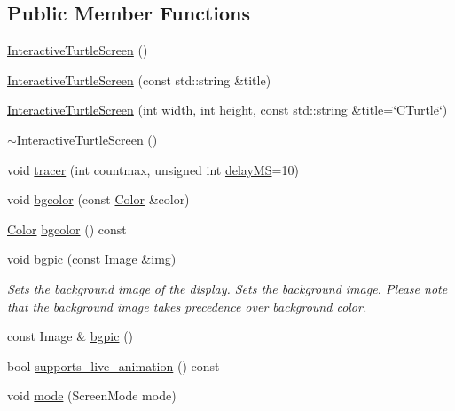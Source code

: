 \subsection*{Public Member Functions}
\begin{DoxyCompactItemize}
\item 
\hyperlink{classcturtle_1_1InteractiveTurtleScreen_a3a2fc53b07958002992b8189a5af62f6}{Interactive\+Turtle\+Screen} ()
\item 
\hyperlink{classcturtle_1_1InteractiveTurtleScreen_ad65865be39cbe33c8614bb14f918058f}{Interactive\+Turtle\+Screen} (const std\+::string \&title)
\item 
\hyperlink{classcturtle_1_1InteractiveTurtleScreen_af9fb0672e3b17b2c07497de0b9ef99ee}{Interactive\+Turtle\+Screen} (int width, int height, const std\+::string \&title=\char`\"{}C\+Turtle\char`\"{})
\item 
\hyperlink{classcturtle_1_1InteractiveTurtleScreen_a74aecb49c64fd0035750c521d6029ccf}{$\sim$\+Interactive\+Turtle\+Screen} ()
\item 
void \hyperlink{classcturtle_1_1InteractiveTurtleScreen_ac6cbbcf714c490abb300cd6a931950f3}{tracer} (int countmax, unsigned int \hyperlink{classcturtle_1_1InteractiveTurtleScreen_a26338beec078bb1c29792cd658c1be71}{delay\+MS}=10)
\item 
void \hyperlink{classcturtle_1_1InteractiveTurtleScreen_acb5441704b45a01830d69df46a23732f}{bgcolor} (const \hyperlink{classcturtle_1_1Color}{Color} \&color)
\item 
\hyperlink{classcturtle_1_1Color}{Color} \hyperlink{classcturtle_1_1InteractiveTurtleScreen_a55289593218ba99904f7957700ef7dae}{bgcolor} () const
\item 
void \hyperlink{classcturtle_1_1InteractiveTurtleScreen_af681fbd6140ea760204fa9a1766725e3}{bgpic} (const Image \&img)
\begin{DoxyCompactList}\small\item\em Sets the background image of the display. Sets the background image. Please note that the background image takes precedence over background color. \end{DoxyCompactList}\item 
const Image \& \hyperlink{classcturtle_1_1InteractiveTurtleScreen_a57a90b8e6163e46c6fcb6f37b0b00e78}{bgpic} ()
\item 
bool \hyperlink{classcturtle_1_1InteractiveTurtleScreen_ad28f7c6e4058541a2c4258b4455fad74}{supports\+\_\+live\+\_\+animation} () const
\item 
void \hyperlink{classcturtle_1_1InteractiveTurtleScreen_a1c666afe65211cf9eedaffa17206a697}{mode} (Screen\+Mode mode)

\end{DoxyCompactItemize}
